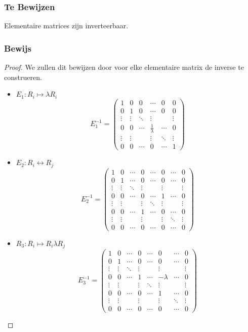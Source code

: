 \documentclass[lineaire_algebra_oplossingen.tex]{subfiles}
\begin{document}
\subsubsection*{Te Bewijzen}
Elementaire matrices zijn inverteerbaar.

\subsubsection*{Bewijs}
\begin{proof}
We zullen dit bewijzen door voor elke elementaire matrix de inverse te construeren.
\begin{itemize}
\item $E_1: R_i\mapsto \lambda R_i$
\[
E_1^{-1}=
\begin{pmatrix}
1 & 0 & 0 & \cdots & 0 & 0\\
0 & 1 & 0 & \cdots & 0 & 0\\
\vdots & \vdots & \ddots & \vdots& & \vdots\\
0 & 0 & \cdots & \frac{1}{\lambda} & \cdots & 0\\
\vdots & \vdots & & \vdots& \ddots & \vdots\\
0 & 0 & \cdots & 0 & \cdots &1
\end{pmatrix}
\]

\item $E_2: R_i \leftrightarrow R_j$
\[
E_2^{-1}=
\begin{pmatrix}
1 & 0 & \cdots & 0 & \cdots & 0 & \cdots & 0\\
0 & 1 & \cdots & 0 & \cdots & 0 & \cdots & 0\\
\vdots & \vdots & \ddots & \vdots& & \vdots & &\vdots\\
0 & 0 & \cdots & 0 & \cdots & 1 & \cdots & 0\\
\vdots & \vdots & & \vdots& \ddots & \vdots & &\vdots\\
0 & 0 & \cdots & 1 & \cdots & 0 & \cdots & 0\\
\vdots & \vdots & & \vdots & & \vdots & \ddots & \vdots\\
0 & 0 & \cdots & 0 & \cdots & 0 & \cdots & 0
\end{pmatrix}
\]
\item $R_3: R_i \mapsto R_i \lambda R_j$
\[
E_3^{-1}=
\begin{pmatrix}
1 & 0 & \cdots & 0 & \cdots & 0 & \cdots & 0\\
0 & 1 & \cdots & 0 & \cdots & 0 & \cdots & 0\\
\vdots & \vdots & \ddots & \vdots& & \vdots & &\vdots\\
0 & 0 & \cdots & 1 & \cdots & -\lambda & \cdots & 0\\
\vdots & \vdots & & \vdots& \ddots & \vdots & &\vdots\\
0 & 0 & \cdots & 0 & \cdots & 1 & \cdots & 0\\
\vdots & \vdots & & \vdots & & \vdots & \ddots & \vdots\\
0 & 0 & \cdots & 0 & \cdots & 0 & \cdots & 0
\end{pmatrix}
\]
\end{itemize}
\end{proof}
\end{document}
